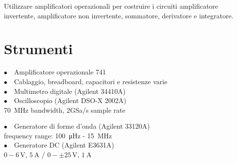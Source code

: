 Utilizzare amplificatori operazionali per costruire i circuiti amplificatore invertente, amplificatore non invertente, sommatore, derivatore e integratore. 

\section{Strumenti}
%
\noindent
\begin{minipage}{.5\linewidth}
$\bullet \quad$Amplificatore operazionale 741\\
$\bullet \quad$Cablaggio, breadboard, capacitori e resistenze varie\\
$\bullet \quad$Multimetro digitale (Agilent 34410A)\\
$\bullet \quad$Oscilloscopio (Agilent DSO-X 2002A)\\
\phantom{xxxx}\SI{70}{\mega\hertz} bandwidth, 2GSa/s sample rate\\
\end{minipage}%
\begin{minipage}{.5\linewidth}
$\bullet \quad$Generatore di forme d'onda (Agilent 33120A)\\
\phantom{xxxx}frequency range: \SI{100}{\micro\hertz} - \SI{15}{\mega\hertz}\\
$\bullet \quad$Generatore DC (Agilent E3631A)\\
\phantom{xxxx}$0-6\,\si{\volt}$, $\SI{5}{\ampere}$ / $0-\pm25\,\si{\volt}$, $\SI{1}{\ampere}$\\
\end{minipage}